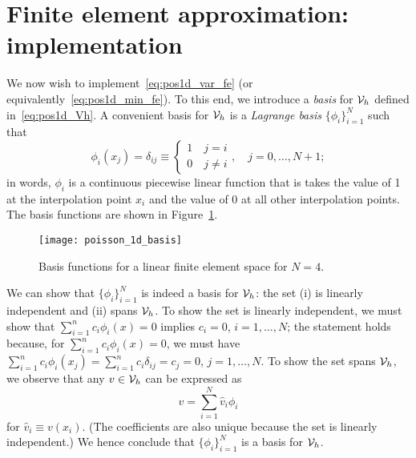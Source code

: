 \section{Finite element approximation: implementation}
We now wish to implement~\eqref{eq:pos1d_var_fe} (or equivalently~\eqref{eq:pos1d_min_fe}).  To this end, we introduce a \emph{basis} for $\mathcal{V}_h$ defined in~\eqref{eq:pos1d_Vh}.  A convenient basis for $\mathcal{V}_h$ is a \emph{Lagrange basis} $\{\phi_i\}_{i=1}^N$ such that 
\begin{equation*}
  \phi_i(x_j) = \delta_{ij} \equiv  \begin{cases}
    1 \quad j = i \\
    0 \quad j\neq i
  \end{cases},
  \quad j = 0,\dots,N+1;
\end{equation*}
in words, $\phi_i$ is a continuous piecewise linear function that is takes the value of 1 at the interpolation point $x_i$ and the value of 0 at all other interpolation points.  The basis functions are shown in Figure~\ref{fig:pos1d_basis}.

\begin{figure}
  \centering
  \texttt{[image: poisson\_1d\_basis]}
  \caption{Basis functions for a linear finite element space for $N = 4$.}
  \label{fig:pos1d_basis}
\end{figure}

We can show that $\{ \phi_i \}_{i=1}^N$ is indeed a basis for $\mathcal{V}_h$: the set (i) is linearly independent and (ii) spans $\mathcal{V}_h$. To show the set is linearly independent, we must show that $\sum_{i=1}^n c_i \phi_i(x) = 0$ implies $c_i = 0$, $i = 1,\dots,N$; the statement holds because, for $\sum_{i=1}^n c_i \phi_i(x) = 0$, we must have $\sum_{i=1}^n c_i \phi_i(x_j) = \sum_{i=1}^n c_i \delta_{ij} = c_j = 0$, $j = 1,\dots,N$. To show the set spans $\mathcal{V}_h$, we observe that any $v \in \mathcal{V}_h$ can be expressed as
\begin{equation*}
  v = \sum_{i=1}^N \hat v_i \phi_i
\end{equation*}
for $\hat v_i \equiv v(x_i)$. (The coefficients are also unique because the set is linearly independent.)  We hence conclude that $\{\phi_i\}_{i=1}^N$ is a basis for $\mathcal{V}_h$. 


